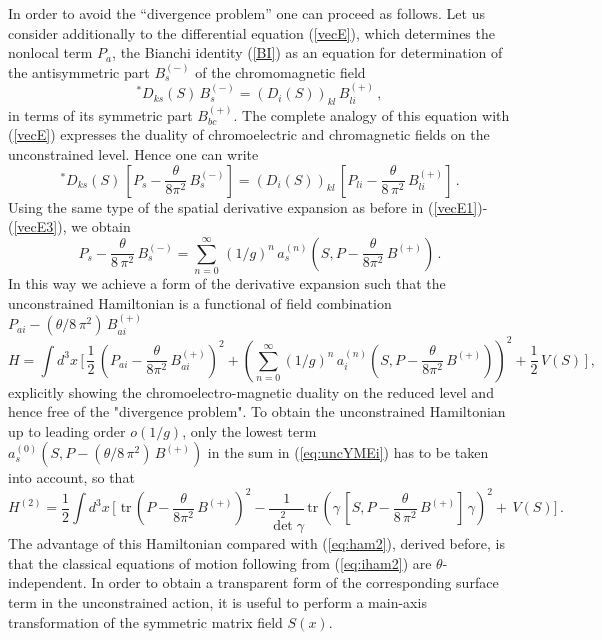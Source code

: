 \documentclass[a4paper,12pt]{article}
\begin{document}
In order to avoid the ``divergence problem''  one can proceed as follows.
Let us consider additionally to the differential equation (\ref{vecE}),
which determines the nonlocal term $P_a$, the Bianchi identity (\ref{BI})
as an equation for determination of the antisymmetric part $B^{(-)}_s$
of the chromomagnetic field
\begin{equation}
\label{eq:abm}
^{\ast}\! D_{ks}(S)\, B^{(-)}_s = (D_i(S))_{kl}\, B^{(+)}_{li}\,,
\end{equation}
in terms of its symmetric part $B^{(+)}_{bc}$.
The complete analogy of this equation with (\ref{vecE}) expresses the
duality of chromoelectric and chromagnetic fields on the unconstrained level.
Hence one can write
\begin{equation}
\label{eq:BG}
^{\ast}\! D_{ks}(S)\,
\left[P_s - \frac{\theta}{8 \pi^2}\, B^{(-)}_s \right] =
(D_i(S))_{kl}\,
\left[ P_{li} - \frac{\theta}{8\, \pi^2}\, B^{(+)}_{li}\right]\,.
\end{equation}
Using the same type of the spatial derivative expansion as before in
(\ref{vecE1})-(\ref{vecE3}), we obtain
\begin{equation}
\label{P-B-}
P_s - \frac{\theta}{8\, \pi^2}\, B^{(-)}_s =
\sum_{n = 0}^{\infty}\,(1/g)^n\,
a^{(n)}_s(S, P - \frac{\theta}{8 \pi^2} \, B^{(+)})\,.
\end{equation}
In this way we achieve a form of the derivative expansion such that the
unconstrained Hamiltonian is a functional of
field combination $P_{ai} - (\theta/8 \,\pi^2)\, B^{(+)}_{ai}$
\begin{equation}
\label{eq:uncYMEi}
H =
\int d^3{x}\, \biggl[\,
\frac{1}{2}\, \left(P_{ai} - \frac{\theta}{8\pi^2}\, B^{(+)}_{ai}\right)^2 +
\left(
\sum_{n=0}^{\infty}(1/g)^n\,
a^{(n)}_i(S, P - \frac{\theta}{8 \pi^2}\, B^{(+)})\right)^2
+ \frac{1}{2}\, V(S) \, \biggr]\,,
\end{equation}
explicitly showing the chromoelectro-magnetic duality on the reduced level
and hence free of the "divergence problem".
To obtain the unconstrained Hamiltonian up to leading order $o(1/g)$,
only the lowest term $a^{(0)}_s(S, P - (\theta/8 \,\pi^2)\, B^{(+)})$
in the sum in (\ref{eq:uncYMEi}) has to be taken into account, so that
\begin{equation}
\label{eq:iham2}
H^{(2)} =
\frac{1}{2}\int d^3{x}\, \biggl[\,
\, \mbox{tr}\, \left( P - \frac{\theta}{8\pi^2}\, B^{(+)}\right)^2 -
\frac{1}{ \det^2 \gamma}\, \mbox{tr}\,
\left(\gamma\, [S, P - \frac{\theta}{8 \,\pi^2}\, B^{(+)}]\, \gamma\right)^2 +
\, V(S)
\biggr]\,.
\end{equation}
The advantage of this Hamiltonian compared with (\ref{eq:ham2}), derived
before, is that the classical equations of motion following from
(\ref{eq:iham2}) are $\theta$-independent.
In order to obtain a transparent
form of the corresponding surface term in the unconstrained action,
it is useful to perform a main-axis transformation of the symmetric
matrix field $S(x)$.
\end{document}
